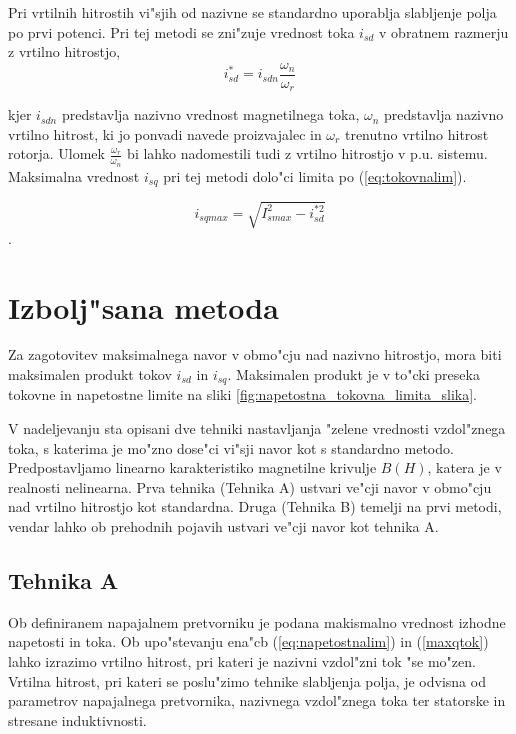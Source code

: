 \documentclass[journal,a4paper,twoside]{sty/IEEEtran}
\begin{document}
Pri vrtilnih hitrostih vi"sjih od nazivne se standardno uporablja slabljenje polja po prvi potenci. Pri tej metodi se zni"zuje vrednost toka $i_{sd}$ v obratnem razmerju z vrtilno hitrostjo,
\begin{equation}
\label{eq:standardna_metoda}
i_{sd}^*=i_{sdn}\frac{\omega_n}{\omega_r}
\end{equation}

kjer $i_{sdn}$ predstavlja nazivno vrednost magnetilnega toka, $\omega_{n}$ predstavlja nazivno vrtilno hitrost, ki jo ponvadi navede proizvajalec in $\omega_{r}$ trenutno vrtilno hitrost rotorja. Ulomek $\frac{\omega_r}{\omega_n}$ bi lahko nadomestili tudi z vrtilno hitrostjo v p.u. sistemu. Maksimalna vrednost $i_{sq}$ pri tej metodi dolo"ci limita po (\ref{eq:tokovnalim}).\cite{vas}

\begin{equation}
i_{sqmax}=\sqrt{I_{smax}^2-i_{sd}^{*2}}
\label{maxqtok}
\end{equation}.










\section{Izbolj"sana metoda}

Za zagotovitev maksimalnega navor v obmo"cju nad nazivno hitrostjo, mora biti maksimalen produkt tokov $i_{sd}$ in $i_{sq}$. Maksimalen produkt je v to"cki preseka tokovne in napetostne limite na sliki \ref{fig:napetostna_tokovna_limita_slika}.

V nadeljevanju sta opisani dve tehniki nastavljanja "zelene vrednosti vzdol"znega toka, s katerima je mo"zno dose"ci vi"sji navor kot s standardno metodo. Predpostavljamo linearno karakteristiko magnetilne krivulje $B(H)$, katera je v realnosti nelinearna. Prva tehnika (Tehnika A) ustvari ve"cji navor v obmo"cju nad vrtilno hitrostjo kot standardna. Druga (Tehnika B) temelji na prvi metodi, vendar lahko ob prehodnih pojavih ustvari ve"cji navor kot tehnika A.\cite{vas}

\subsection{Tehnika A}
\label{sec:prva_metoda}


Ob definiranem napajalnem pretvorniku je podana makismalno vrednost izhodne napetosti in toka. Ob upo"stevanju ena"cb (\ref{eq:napetostnalim}) in (\ref{maxqtok}) lahko izrazimo vrtilno hitrost, pri kateri je nazivni vzdol"zni tok "se mo"zen. Vrtilna hitrost, pri kateri se poslu"zimo tehnike slabljenja polja, je odvisna od parametrov napajalnega pretvornika, nazivnega vzdol"znega toka ter statorske in stresane induktivnosti. 
\end{document}
